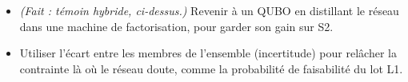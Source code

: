 \begin{pistes}
\begin{itemize}
\item \emph{(Fait : témoin hybride, ci-dessus.)} Revenir à un QUBO en distillant le réseau dans une machine de factorisation, pour garder son gain sur S2.
\item Utiliser l'écart entre les membres de l'ensemble (incertitude) pour relâcher la contrainte là où le réseau doute, comme la probabilité de faisabilité du lot L1.
\end{itemize}
\end{pistes}

